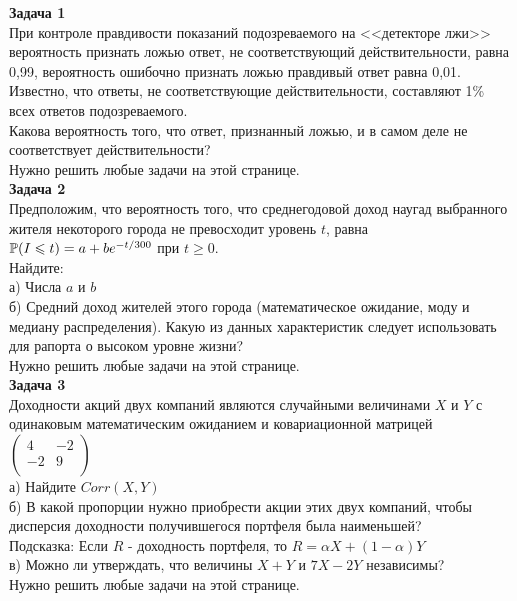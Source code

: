 \documentclass[pdftex,12pt,a4paper]{article}
\begin{document}
\textbf{Задача 1} \\ %
При контроле правдивости показаний подозреваемого на <<детекторе лжи>> вероятность признать ложью ответ, не соответствующий действительности, равна 0,99, вероятность ошибочно признать ложью правдивый ответ равна 0,01. Известно, что ответы, не соответствующие действительности, составляют 1\% всех ответов подозреваемого. \\
Какова вероятность того, что ответ, признанный ложью, и в самом деле не соответствует действительности?\\

Нужно решить любые \textbf{} задачи на этой странице. \\


\textbf{Задача 2} \\
Предположим, что вероятность того, что среднегодовой доход наугад выбранного жителя некоторого города не превосходит уровень $t$, равна $\P(I\le t)=a+be^{-t/300}$ при $t\ge 0$. \\
Найдите: \\
а) Числа $a$ и $b$ \\
б) Средний доход жителей этого города (математическое ожидание, моду и медиану распределения). Какую из данных характеристик следует использовать для рапорта о высоком уровне жизни? \\

Нужно решить любые \textbf{} задачи на этой странице. \\

\textbf{Задача 3} \\
Доходности акций двух компаний являются случайными величинами $X$ и $Y$ с одинаковым математическим ожиданием и ковариационной матрицей $\left( \begin{array}{cc}
   4 & -2  \\
   -2 & 9  \\
\end{array}\right)$  \\
а) Найдите $Corr(X,Y)$ \\
б) В какой пропорции нужно приобрести акции этих двух компаний, чтобы дисперсия доходности получившегося портфеля была наименьшей? \\
Подсказка: Если $R$ - доходность портфеля, то $R=\alpha X+(1-\alpha)Y$ \\
в) Можно ли утверждать, что величины $X+Y$ и $7X-2Y$ независимы? \\

Нужно решить любые \textbf{} задачи на этой странице. \\
\end{document}
